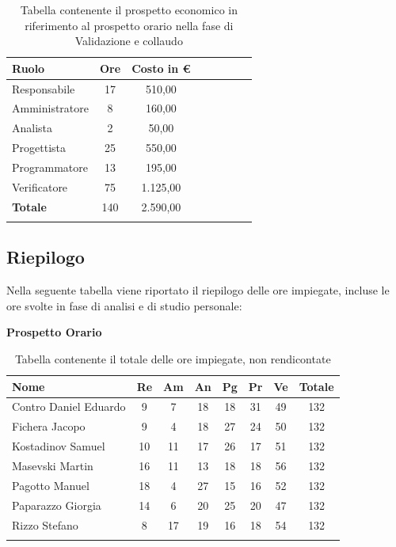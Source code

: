 \documentclass[../piano_di_progetto.tex]{subfiles}
\begin{document}
\begin{center}
	\begin{longtable}{|l|c|c|c|c|c|c|c|}
		\hline
		\rowcolor{lightgray}
		\textbf{Ruolo} & \textbf{Ore} & \textbf{Costo in €}\\

		\hline
		Responsabile & 17 & 510,00\\
		\hline
		Amministratore & 8 & 160,00\\
		\hline
		Analista & 2 & 50,00\\
		\hline
		Progettista & 25 & 550,00\\
		\hline
		Programmatore & 13 & 195,00\\
		\hline
		Verificatore & 75 & 1.125,00\\
		\hline
		\textbf{Totale} & 140 & 2.590,00\\
		\hline
		\caption{Tabella contenente il prospetto economico in riferimento al prospetto orario nella fase di Validazione e collaudo}
	\end{longtable}
\end{center}


\subsection{Riepilogo}%
\label{sub:riepilog}
Nella seguente tabella viene riportato il riepilogo delle ore impiegate, incluse le ore svolte in fase di analisi e di studio personale:

\textbf{Prospetto Orario}

\begin{center}
	\begin{longtable}{|l|c|c|c|c|c|c|c|}
		\hline
		\rowcolor{lightgray}
		\textbf{Nome} & \textbf{Re} & \textbf{Am} & \textbf{An} & \textbf{Pg}  & \textbf{Pr}   & \textbf{Ve} & \textbf{Totale} \\

		\hline
			Contro Daniel Eduardo & 9 & 7 & 18 & 18 & 31 & 49 & 132 \\
		\hline
			Fichera Jacopo & 9 & 4 & 18 & 27 & 24 & 50 & 132 \\
		\hline
			Kostadinov Samuel & 10 & 11 & 17 & 26 & 17 & 51 & 132 \\
		\hline
			Masevski Martin & 16 & 11 & 13 & 18 & 18 & 56 & 132 \\
		\hline
			Pagotto Manuel & 18 & 4 & 27 & 15 & 16 & 52 & 132 \\			
		\hline
			Paparazzo Giorgia & 14 & 6 & 20 & 25 & 20 & 47 & 132 \\
		\hline
			Rizzo Stefano & 8 & 17 & 19 & 16 & 18 & 54 & 132 \\
		\hline	

		\caption{Tabella contenente il totale delle ore impiegate, non rendicontate}
	\end{longtable}
\end{center}
\end{document}
